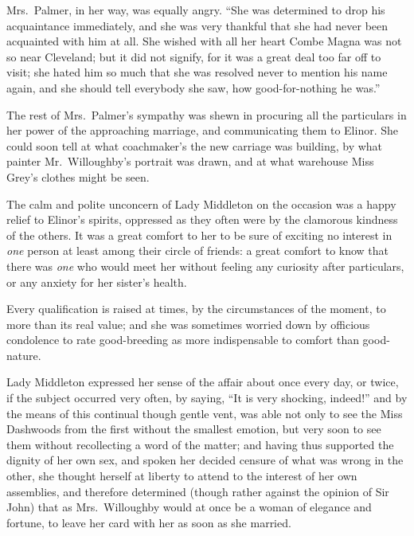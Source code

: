 \documentclass{article}
\begin{document}
Mrs.\ Palmer, in her way, was equally angry.
``She was determined to drop his acquaintance immediately,
and she was very thankful that she had never been acquainted
with him at all.  She wished with all her heart Combe
Magna was not so near Cleveland; but it did not signify,
for it was a great deal too far off to visit; she hated
him so much that she was resolved never to mention
his name again, and she should tell everybody she saw,
how good-for-nothing he was.''

The rest of Mrs.\ Palmer's sympathy was shewn in procuring
all the particulars in her power of the approaching marriage,
and communicating them to Elinor.  She could soon tell
at what coachmaker's the new carriage was building,
by what painter Mr.\ Willoughby's portrait was drawn,
and at what warehouse Miss Grey's clothes might be seen.

The calm and polite unconcern of Lady Middleton
on the occasion was a happy relief to Elinor's spirits,
oppressed as they often were by the clamorous kindness
of the others.  It was a great comfort to her to be sure
of exciting no interest in \emph{one} person at least among their
circle of friends: a great comfort to know that there
was \emph{one} who would meet her without feeling any curiosity
after particulars, or any anxiety for her sister's health.

Every qualification is raised at times, by the
circumstances of the moment, to more than its real value;
and she was sometimes worried down by officious condolence
to rate good-breeding as more indispensable to comfort
than good-nature.

Lady Middleton expressed her sense of the affair
about once every day, or twice, if the subject occurred
very often, by saying, ``It is very shocking, indeed!''
and by the means of this continual though gentle vent,
was able not only to see the Miss Dashwoods from the
first without the smallest emotion, but very soon
to see them without recollecting a word of the matter;
and having thus supported the dignity of her own sex,
and spoken her decided censure of what was wrong
in the other, she thought herself at liberty to attend
to the interest of her own assemblies, and therefore
determined (though rather against the opinion of Sir John)
that as Mrs.\ Willoughby would at once be a woman of elegance
and fortune, to leave her card with her as soon as she married.
\end{document}
